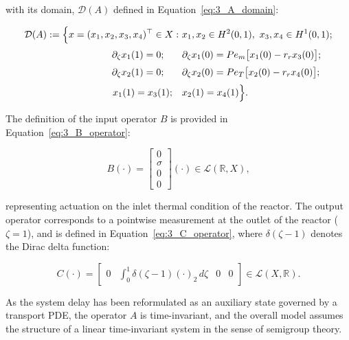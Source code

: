 with its domain, $\mathcal{D}(A)$ defined in Equation~\eqref{eq:3_A_domain}:

\begin{equation} \label{eq:3_A_domain}
\begin{aligned}
\mathcal{D}(A) := \Big\{ x = (x_1, x_2, x_3, x_4)^\top \in X :\ 
& x_1, x_2 \in H^2(0,1),\ x_3, x_4 \in H^1(0,1); \\[0.5ex]
\partial_\zeta x_1(1) = 0; \hspace{1.9em} & \partial_\zeta x_1(0) = Pe_m \bigl[ x_1(0) - r_r x_3(0) \bigr]; \\[0.5ex]
\partial_\zeta x_2(1) = 0; \hspace{1.9em} & \partial_\zeta x_2(0) = Pe_T \bigl[ x_2(0) - r_r x_4(0) \bigr]; \\[0.5ex]
x_1(1) = x_3(1); \quad & x_2(1) = x_4(1)
\Big\}.
\end{aligned}
\end{equation}

The definition of the input operator $B$ is provided in Equation~\eqref{eq:3_B_operator}:

\begin{equation} \label{eq:3_B_operator}
B (\cdot) = \begin{bmatrix} 0 \\ \sigma \\ 0 \\ 0 \end{bmatrix} (\cdot) \in \mathcal{L}(\mathbb{R}, X),
\end{equation}

representing actuation on the inlet thermal condition of the reactor. The output operator corresponds to a pointwise measurement at the outlet of the reactor ($\zeta = 1$), and is defined in Equation~\eqref{eq:3_C_operator}, where $\delta(\zeta - 1)$ denotes the Dirac delta function:

\begin{equation} \label{eq:3_C_operator}
C (\cdot) = \begin{bmatrix} 0 & \int_0^1 \delta(\zeta - 1)(\cdot)_2\, d\zeta & 0 & 0 \end{bmatrix} \in \mathcal{L}(X, \mathbb{R}).
\end{equation}

As the system delay has been reformulated as an auxiliary state governed by a transport PDE, the operator $A$ is time-invariant, and the overall model assumes the structure of a linear time-invariant system in the sense of semigroup theory.


